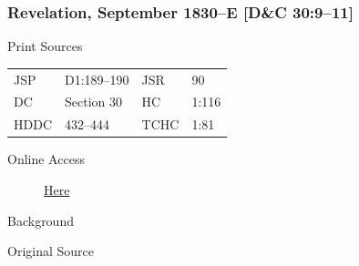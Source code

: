 		\subsubsection{Revelation, September 1830--E [D\&C 30:9--11]}
			\label{EMS-1830-JS-SEP-1830-E}
		
			\begin{description}
				\item[Print Sources]
			\end{description}

				\begin{tabular}{p{0.5in}p{1in}p{0.5in}p{1in}}
				JSP	 	& D1:189--190	& JSR 		& 90	 \\
				DC	 	& Section 30	& HC 		& 1:116 \\
				HDDC 	& 432--444		& TCHC 		& 1:81 \\
				\end{tabular}
			
			\begin{description}
				\item[Online Access] \href{https://www.josephsmithpapers.org/paper-summary/revelation-september-1830-e-dc-309-11/1}{Here}
			\end{description}
			
			\begin{description}
				\item[Background]
			\end{description}
			
			
			\begin{description}
				\item[Original Source]
			\end{description}
			
			
